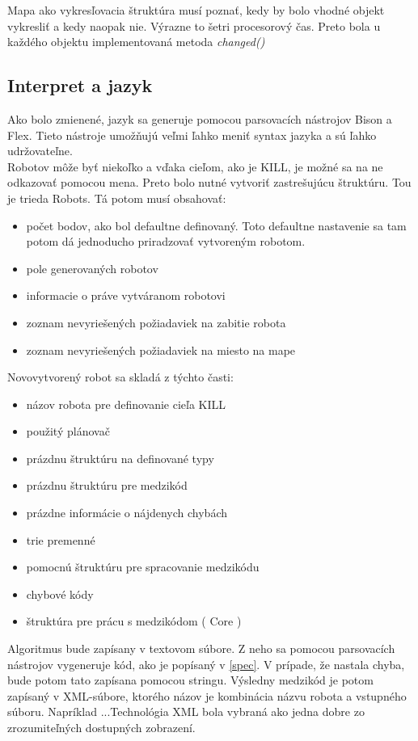 Mapa ako vykresľovacia štruktúra musí poznať, kedy by bolo vhodné objekt vykresliť a kedy naopak nie. Výrazne to šetri procesorový čas. Preto bola u každého objektu implementovaná metoda {\it changed() } 

\subsection{Interpret a jazyk}
Ako bolo zmienené, jazyk sa generuje pomocou parsovacích nástrojov Bison a Flex. Tieto nástroje umožňujú veľmi ľahko meniť syntax jazyka a sú ľahko udržovateľne.\\ %
Robotov môže byť niekoľko a vďaka cieľom, ako je KILL, je možné sa na ne odkazovať pomocou mena. Preto bolo nutné vytvoriť zastrešujúcu štruktúru. Tou je trieda Robots. Tá potom musí obsahovať:
\begin{itemize}
\item počet bodov, ako bol defaultne definovaný. Toto defaultne nastavenie sa tam potom dá jednoducho priradzovať vytvoreným robotom.
\item pole generovaných robotov
\item informacie o práve vytváranom robotovi
\item zoznam nevyriešených požiadaviek na zabitie robota
\item zoznam nevyriešených požiadaviek na miesto na mape
\end{itemize}
Novovytvorený robot sa skladá z týchto časti:
\begin{itemize}
\item názov robota pre definovanie cieľa KILL
\item použitý plánovač
\item prázdnu štruktúru na definované typy
\item prázdnu štruktúru pre medzikód
\item prázdne informácie o nájdenych chybách
\item trie premenné
\item pomocnú štruktúru pre spracovanie medzikódu %
\item chybové kódy
\item štruktúra pre prácu s medzikódom ( Core )
\end{itemize}
Algoritmus bude zapísany v textovom súbore. Z neho sa pomocou parsovacích nástrojov vygeneruje kód, ako je popísaný v \ref{spec}. V prípade, že nastala chyba, bude potom tato zapísana pomocou stringu. Výsledny medzikód je potom zapísaný v XML-súbore, ktorého názov je kombinácia názvu robota a vstupného súboru. Napríklad ...Technológia XML bola vybraná ako jedna dobre zo zrozumiteľných dostupných zobrazení. 

